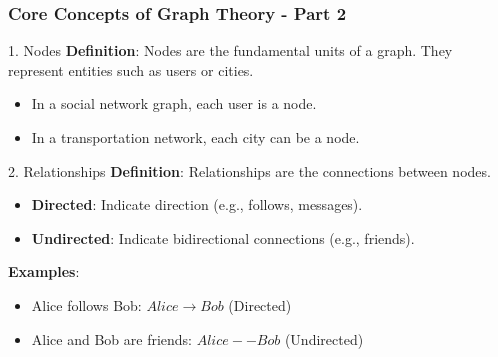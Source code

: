 \documentclass[aspectratio=169]{beamer}
\begin{document}
\begin{frame}[fragile]
    \frametitle{Core Concepts of Graph Theory - Part 2}
    \begin{block}{1. Nodes}
        \textbf{Definition}: Nodes are the fundamental units of a graph. 
        They represent entities such as users or cities.
        \begin{example}
            \begin{itemize}
                \item In a social network graph, each user is a node.
                \item In a transportation network, each city can be a node.
            \end{itemize}
        \end{example}
    \end{block}
    
    \begin{block}{2. Relationships}
        \textbf{Definition}: Relationships are the connections between nodes.
        \begin{itemize}
            \item \textbf{Directed}: Indicate direction (e.g., follows, messages).
            \item \textbf{Undirected}: Indicate bidirectional connections (e.g., friends).
        \end{itemize}
        
        \textbf{Examples}:
        \begin{itemize}
            \item Alice follows Bob: $Alice \rightarrow Bob$ (Directed)
            \item Alice and Bob are friends: $Alice -- Bob$ (Undirected)
        \end{itemize}
    \end{block}
\end{frame}
\end{document}
